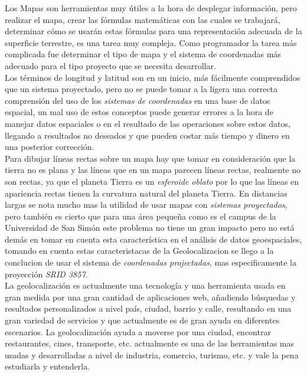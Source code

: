     Los Mapas son herramientas muy útiles a la hora de desplegar información, pero realizar el mapa, crear las fórmulas matemáticas con las cuales se trabajará, determinar cómo se usarán estas fórmulas para una representación adecuada de la superficie terrestre, es una tarea muy compleja. Como programador la tarea más complicada fue determinar el tipo de mapa y el sistema de coordenadas más adecuado para el tipo proyecto que se necesita desarrollar.\\

    Los términos de longitud y latitud son en un inicio, más fácilmente comprendidos que un sistema proyectado, pero no se puede tomar a la ligera una correcta comprensión del uso de los \emph{sistemas de coordenadas} en una base de datos espacial, un mal uso de estos conceptos puede generar errores a la hora de manejar datos  espaciales o en el resultado de las operaciones sobre estos  datos, llegando a resultados no deseados y que pueden costar más tiempo y dinero en una posterior corrección.\\


    Para dibujar líneas rectas sobre un mapa hay que tomar en consideración que la tierra no es plana y las líneas que en un mapa parecen líneas rectas, realmente no son rectas, ya que el planeta Tierra es un \emph{esferoide oblato} por lo que las líneas en apariencia rectas tienen la curvatura natural del planeta Tierra. En distancias largas se nota mucho mas la utilidad de usar mapas con \emph{sistemas proyectados}, pero también es cierto que para una área pequeña como es el campus de la Universidad de San Simón este problema no tiene un gran impacto pero no está demás en tomar en cuenta esta característica en el análisis de datos geoespaciales, tomando en cuenta estas caracteristacas de la Geolocalizacion se llego a la conclucion de usar
    el sistema de \emph{coordenadas projectadas}, mas especificamente la proyección \emph{SRID 3857}.\\



    La geolocalización es actualmente una tecnología y una herramienta usada en gran medida por una gran cantidad de aplicaciones web, añadiendo búsquedas y resultados personalizados a nivel país, ciudad, barrio y calle, resultando en una gran variedad de servicios y que actualmente es de gran ayuda en diferentes escenarios. La geolocalización ayuda a moverse por una ciudad, encontrar restaurantes, cines, transporte, etc. actualmente es una de las herramientas mas usadas y desarrolladas a nivel de industria, comercio, turismo, etc. y vale la pena estudiarla y entenderla.\\








